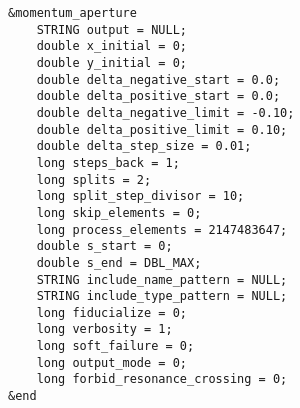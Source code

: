 \documentclass[11pt]{article}
\begin{document}
\begin{verbatim}
&momentum_aperture
    STRING output = NULL;
    double x_initial = 0;
    double y_initial = 0;
    double delta_negative_start = 0.0;
    double delta_positive_start = 0.0;
    double delta_negative_limit = -0.10;
    double delta_positive_limit = 0.10;
    double delta_step_size = 0.01;
    long steps_back = 1;
    long splits = 2;
    long split_step_divisor = 10;
    long skip_elements = 0;
    long process_elements = 2147483647;
    double s_start = 0;
    double s_end = DBL_MAX;
    STRING include_name_pattern = NULL;
    STRING include_type_pattern = NULL;
    long fiducialize = 0;
    long verbosity = 1;
    long soft_failure = 0;
    long output_mode = 0;
    long forbid_resonance_crossing = 0;
&end
\end{verbatim}
\end{document}
